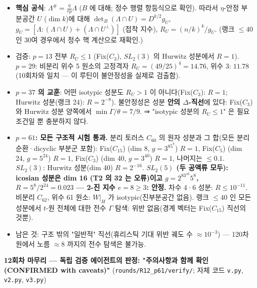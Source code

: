 \begin{itemize}
\tightlist
\item
  \textbf{핵심 공식}: \(\Lambda^\#=\frac{\eta}{rp}\Lambda\) (\(B\) 에 대해; 정수 행렬 항등식으로 확인). 따라서 \(\eta\)-안정 부분공간 \(U\) (\(\dim k\))에 대해 \(\det_B(\Lambda\cap U)=D^{k/2}g_U\), \(g_U=[\Lambda:(\Lambda\cap U)+(\Lambda\cap U^\perp)]\) (접착 지수), \textbf{\(R_U=(n/k)^k/g_U\)}. (랭크 \(\le40\) 인 30여 경우에서 정수 핵 계산으로 재확인.)
\item
  검증: \(p=13\) 전부 \(R_U\le1\) (Fix(\(C_3\)), \(SL_2(3)\) 의 Hurwitz 성분에서 \(R=1\)). \(p=29\): 비분리 위수 5 원소의 고정격자 \(R_U=(49/25)^4=14.76\), 위수 3: \(11.78\) (10회차와 일치 --- 이 루틴이 불안정성을 실제로 검출함).
\item
  \textbf{\(p=37\) 의 교훈}: 어떤 isotypic 성분도 \(R_U>1\) 이 아니다(Fix(\(C_3\)): \(R=1\); Hurwitz 성분(랭크 24): \(R=2^{-8}\)). 불안정성은 성분 \textbf{안의 \(\Delta\)-직선}에 있다: Fix(\(C_3\)) 와 Hurwitz 성분 양쪽에서 \(\min\Gamma/\theta=7/9\). ⇒ "isotypic 성분의 \(R_U\le1\)" 은 필요조건일 뿐 충분하지 않다.
\item
  \textbf{\(p=61\): 모든 구조적 시험 통과.} 분리 토러스 \(C_{60}\) 의 원자 성분과 그 합(모든 분리 순환·dicyclic 부분군 포함): Fix(\(C_{15}\)) (dim 8, \(g=3^85^8\)) \(R=1\), Fix(\(C_5\)) (dim 24, \(g=5^{24}\)) \(R=1\), Fix(\(C_3\)) (dim 40, \(g=3^{40}\)) \(R=1\), 나머지는 \(\le0.1\). \(SL_2(3)\): Hurwitz 성분(dim 40) \(R=2^{-16}\). \textbf{\(SL_2(5)\) (두 공액류 모두): icosian 성분은 dim 16 (T2 의 32 는 오류)이고 \(g=2^83^{16}5^8\), \(R=5^8/2^{24}=0.023\) --- 2-진 지수 \(e=8\ge3\): 안정.} 차수 4·6 성분: \(R\le10^{-11}\). 비분리 \(C_{62}\), 위수 61 원소: \(W|_H\) 가 isotypic(진부분공간 없음). 랭크 \(\le40\) 인 모든 성분에서 \(t\)-원 전체에 대한 전수 \(\Gamma\) 탐색: 위반 없음(경계 벡터는 Fix(\(C_{15}\)) 직선의 것뿐).
\item
  남은 것: 구조 밖의 "일반적" 직선(휴리스틱 기대 위반 궤도 수 \(\approx10^{-3}\)) --- 120차원에서 노름 \(\approx8\) 까지의 전수 탐색은 불가능.
\end{itemize}

\textbf{12회차 마무리 --- 독립 검증 에이전트의 판정: "주의사항과 함께 확인(CONFIRMED with caveats)"} (\texttt{rounds/R12\_p61/verify/}; 자체 코드 \texttt{v.py}, \texttt{v2.py}, \texttt{v3.py})

